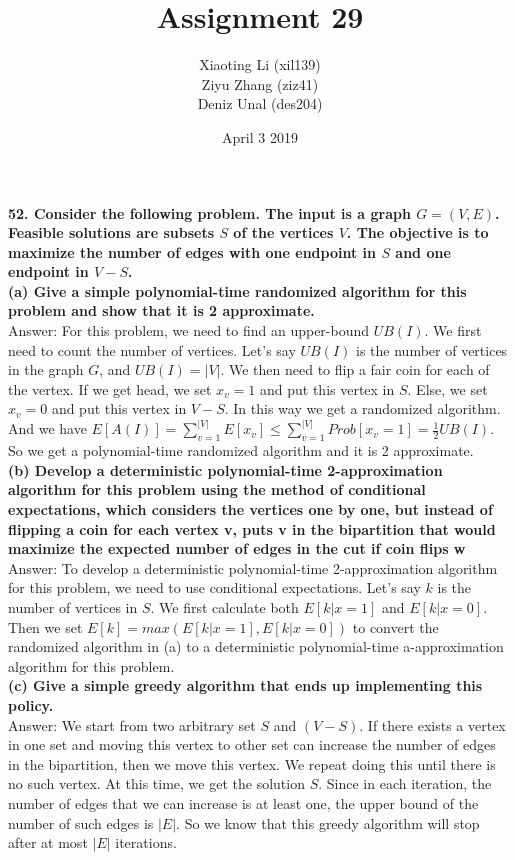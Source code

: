 \documentclass{article}
\title{Assignment 29}
\author{Xiaoting Li (xil139) \\
Ziyu Zhang (ziz41) \\
Deniz Unal (des204)}
\date{April 3 2019}
\begin{document}
\maketitle
\noindent
\textbf{52. Consider the following problem. The input is a graph $G = (V, E)$. Feasible solutions are subsets $S$ of the vertices $V$. The objective is to maximize the number of edges with one endpoint in $S$ and one endpoint in $V-S$.} \\ \newline
\textbf{(a) Give a simple polynomial-time randomized algorithm for this problem and show that it is 2 approximate.} \\ \newline
Answer: For this problem, we need to find an upper-bound $UB(I)$. We first need to count the number of vertices. Let's say $UB(I)$ is the number of vertices in the graph $G$, and $UB(I) = |V|$. We then need to flip a fair coin for each of the vertex. If we get head, we set $x_v = 1$ and put this vertex in $S$. Else, we set $x_v = 0$ and put this vertex in $V - S$. In this way we get a randomized algorithm. And we have $E[A(I)] = \sum_{v=1}^{|V|}E[x_v] \leq \sum_{v=1}^{|V|}Prob[x_v = 1] = \frac{1}{2}UB(I)$. So we get a polynomial-time randomized algorithm and it is 2 approximate.\\ \newline
\textbf{(b) Develop a deterministic polynomial-time 2-approximation algorithm for this problem using the method of conditional expectations, which considers the vertices one by one, but instead of flipping a coin for each vertex v, puts v in the bipartition that would maximize the expected number of edges in the cut if coin flips w} \\ \newline
Answer: To develop a deterministic polynomial-time 2-approximation algorithm for this problem, we need to use conditional expectations. Let's say $k$ is the number of vertices in $S$. We first calculate both $E[k|x = 1]$ and $E[k|x=0]$. Then we set $E[k] = max(E[k|x = 1], E[k|x=0])$ to convert the randomized algorithm in (a) to a deterministic polynomial-time a-approximation algorithm for this problem. \\ \newline
\textbf{(c) Give a simple greedy algorithm that ends up implementing this policy.} \\ \newline
Answer: We start from two arbitrary set $S$ and $(V - S)$. If there exists a vertex in one set and moving this vertex to other set can increase the number of edges in the bipartition, then we move this vertex. We repeat doing this until there is no such vertex. At this time, we get the solution $S$. Since in each iteration, the number of edges that we can increase is at least one, the upper bound of the number of such edges is $|E|$. So we know that this greedy algorithm will stop after at most $|E|$ iterations.\\ \newline
\end{document}
